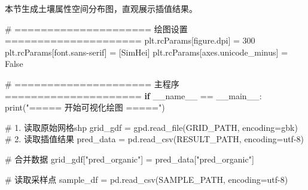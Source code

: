 \documentclass[
  letterpaper,
  DIV=11,
  numbers=noendperiod]{scrreprt}
\newenvironment{Shaded}{\begin{snugshade}}{\end{snugshade}}
\newcommand{\BuiltInTok}[1]{\textcolor[rgb]{0.00,0.23,0.31}{#1}}
\newcommand{\CommentTok}[1]{\textcolor[rgb]{0.37,0.37,0.37}{#1}}
\newcommand{\ControlFlowTok}[1]{\textcolor[rgb]{0.00,0.23,0.31}{\textbf{#1}}}
\newcommand{\DecValTok}[1]{\textcolor[rgb]{0.68,0.00,0.00}{#1}}
\newcommand{\NormalTok}[1]{\textcolor[rgb]{0.00,0.23,0.31}{#1}}
\newcommand{\OperatorTok}[1]{\textcolor[rgb]{0.37,0.37,0.37}{#1}}
\newcommand{\StringTok}[1]{\textcolor[rgb]{0.13,0.47,0.30}{#1}}
\newcommand{\VariableTok}[1]{\textcolor[rgb]{0.07,0.07,0.07}{#1}}
\begin{document}
本节生成土壤属性空间分布图，直观展示插值结果。

\begin{Shaded}
\begin{Highlighting}[]
\CommentTok{\# ===================== 绘图设置 =====================}
\NormalTok{plt.rcParams[}\StringTok{\textquotesingle{}figure.dpi\textquotesingle{}}\NormalTok{] }\OperatorTok{=} \DecValTok{300}
\NormalTok{plt.rcParams[}\StringTok{\textquotesingle{}font.sans{-}serif\textquotesingle{}}\NormalTok{] }\OperatorTok{=}\NormalTok{ [}\StringTok{\textquotesingle{}SimHei\textquotesingle{}}\NormalTok{]}
\NormalTok{plt.rcParams[}\StringTok{\textquotesingle{}axes.unicode\_minus\textquotesingle{}}\NormalTok{] }\OperatorTok{=} \VariableTok{False}

\CommentTok{\# ===================== 主程序 =====================}
\ControlFlowTok{if} \VariableTok{\_\_name\_\_} \OperatorTok{==} \StringTok{\textquotesingle{}\_\_main\_\_\textquotesingle{}}\NormalTok{:}
    \BuiltInTok{print}\NormalTok{(}\StringTok{"===== 开始可视化绘图 ====="}\NormalTok{)}
    
    \CommentTok{\# 1. 读取原始网格shp}
\NormalTok{    grid\_gdf }\OperatorTok{=}\NormalTok{ gpd.read\_file(GRID\_PATH, encoding}\OperatorTok{=}\StringTok{\textquotesingle{}gbk\textquotesingle{}}\NormalTok{)}
    \CommentTok{\# 2. 读取插值结果}
\NormalTok{    pred\_data }\OperatorTok{=}\NormalTok{ pd.read\_csv(RESULT\_PATH, encoding}\OperatorTok{=}\StringTok{\textquotesingle{}utf{-}8\textquotesingle{}}\NormalTok{)}
    
    \CommentTok{\# 合并数据}
\NormalTok{    grid\_gdf[}\StringTok{"pred\_organic"}\NormalTok{] }\OperatorTok{=}\NormalTok{ pred\_data[}\StringTok{"pred\_organic"}\NormalTok{]}
    
    \CommentTok{\# 读取采样点}
\NormalTok{    sample\_df }\OperatorTok{=}\NormalTok{ pd.read\_csv(SAMPLE\_PATH, encoding}\OperatorTok{=}\StringTok{\textquotesingle{}utf{-}8\textquotesingle{}}\NormalTok{)}


\end{Highlighting}
\end{Shaded}
\end{document}
